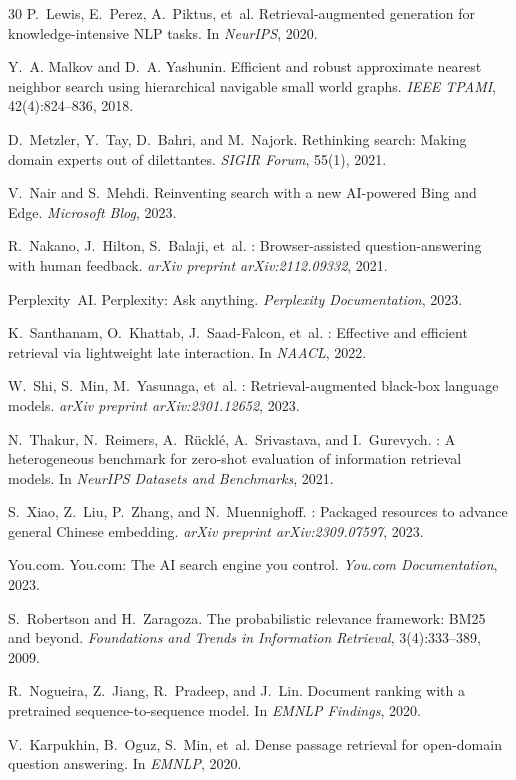 \documentclass[11pt,twocolumn]{article}
\begin{document}
\begin{thebibliography}{30}
P.~Lewis, E.~Perez, A.~Piktus, et~al.
\newblock Retrieval-augmented generation for knowledge-intensive {NLP} tasks.
\newblock In \emph{NeurIPS}, 2020.

Y.~A. Malkov and D.~A. Yashunin.
\newblock Efficient and robust approximate nearest neighbor search using hierarchical navigable small world graphs.
\newblock \emph{IEEE TPAMI}, 42(4):824--836, 2018.

D.~Metzler, Y.~Tay, D.~Bahri, and M.~Najork.
\newblock Rethinking search: Making domain experts out of dilettantes.
\newblock \emph{SIGIR Forum}, 55(1), 2021.

V.~Nair and S.~Mehdi.
\newblock Reinventing search with a new {AI}-powered {Bing} and {Edge}.
\newblock \emph{Microsoft Blog}, 2023.

R.~Nakano, J.~Hilton, S.~Balaji, et~al.
: Browser-assisted question-answering with human feedback.
\newblock \emph{arXiv preprint arXiv:2112.09332}, 2021.

Perplexity~AI.
\newblock Perplexity: Ask anything.
\newblock \emph{Perplexity Documentation}, 2023.

K.~Santhanam, O.~Khattab, J.~Saad-Falcon, et~al.
: Effective and efficient retrieval via lightweight late interaction.
\newblock In \emph{NAACL}, 2022.

W.~Shi, S.~Min, M.~Yasunaga, et~al.
: Retrieval-augmented black-box language models.
\newblock \emph{arXiv preprint arXiv:2301.12652}, 2023.

N.~Thakur, N.~Reimers, A.~R\"uckl\'e, A.~Srivastava, and I.~Gurevych.
: A heterogeneous benchmark for zero-shot evaluation of information retrieval models.
\newblock In \emph{NeurIPS Datasets and Benchmarks}, 2021.

S.~Xiao, Z.~Liu, P.~Zhang, and N.~Muennighoff.
: Packaged resources to advance general {Chinese} embedding.
\newblock \emph{arXiv preprint arXiv:2309.07597}, 2023.

You.com.
\newblock You.com: The {AI} search engine you control.
\newblock \emph{You.com Documentation}, 2023.

S.~Robertson and H.~Zaragoza.
\newblock The probabilistic relevance framework: {BM25} and beyond.
\newblock \emph{Foundations and Trends in Information Retrieval}, 3(4):333--389, 2009.

R.~Nogueira, Z.~Jiang, R.~Pradeep, and J.~Lin.
\newblock Document ranking with a pretrained sequence-to-sequence model.
\newblock In \emph{EMNLP Findings}, 2020.

V.~Karpukhin, B.~Oguz, S.~Min, et~al.
\newblock Dense passage retrieval for open-domain question answering.
\newblock In \emph{EMNLP}, 2020.

\end{thebibliography}
\end{document}
